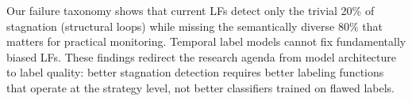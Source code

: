 \documentclass[11pt]{article}
\begin{document}
Our failure taxonomy shows that current LFs detect only the trivial 20\% of stagnation (structural loops) while missing the semantically diverse 80\% that matters for practical monitoring. Temporal label models cannot fix fundamentally biased LFs. These findings redirect the research agenda from model architecture to label quality: better stagnation detection requires better labeling functions that operate at the strategy level, not better classifiers trained on flawed labels.
\end{document}
